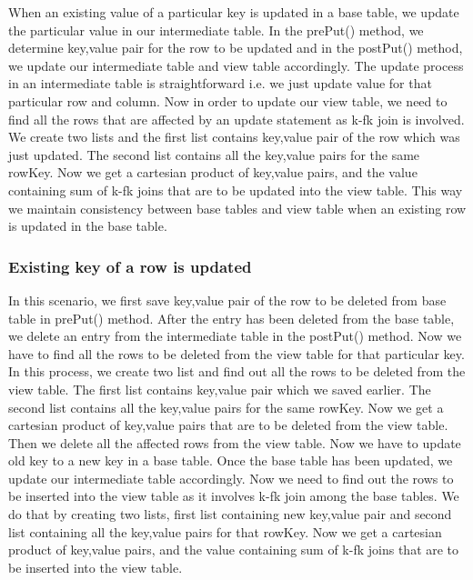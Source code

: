 \documentclass[11pt,a4paper,bibtotoc,idxtotoc,headsepline,footsepline,footexclude,BCOR12mm,DIV13]{scrbook}
\begin{document}
When an existing value of a particular key is updated in a base table, we update the particular value in our intermediate table. In the prePut() method, we determine key,value pair for the row to be updated and in the postPut() method, we update our intermediate table and view table accordingly. The update process in an intermediate table is straightforward i.e. we just update value for that particular row and column. Now in order to update our view table, we need to find all the rows that are affected by an update statement as k-fk join is involved. We create two lists and the first list contains key,value pair of the row which was just updated. The second list contains all the key,value pairs for the same rowKey. Now we get a cartesian product of key,value pairs, and the value containing sum of k-fk joins that are to be updated into the view table. This way we maintain consistency between base tables and view table when an existing row is updated in the base table.

\subsubsection{Existing key of a row is updated}

In this scenario, we first save key,value pair of the row to be deleted from base table in prePut() method. After the entry has been deleted from the base table, we delete an entry from the intermediate table in the postPut() method. Now we have to find all the rows to be deleted from the view table for that particular key. In this process, we create two list and find out all the rows to be deleted from the view table. The first list contains key,value pair which we saved earlier. The second list contains all the key,value pairs for the same rowKey. Now we get a cartesian product of key,value pairs that are to be deleted from the view table. Then we delete all the affected rows from the view table. Now we have to update old key to a new key in a base table. Once the base table has been updated, we update our intermediate table accordingly. Now we need to find out the rows to be inserted into the view table as it involves k-fk join among the base tables. We do that by creating two lists, first list containing new key,value pair and second list containing all the key,value pairs for that rowKey. Now we get a cartesian product of key,value pairs, and the value containing sum of k-fk joins that are to be inserted into the view table.
\end{document}

